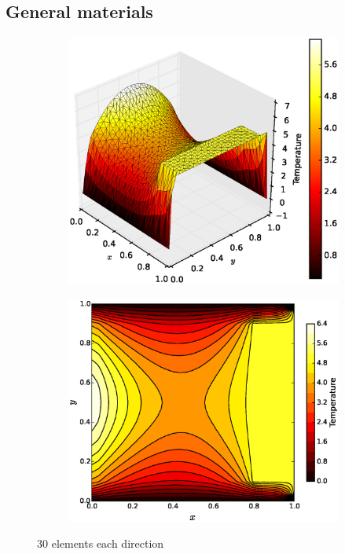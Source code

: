 \documentclass[10pt, a4paper]{article}
\begin{document}
\subsection{General materials}

\begin{figure}[H]
\centering
	\begin{subfigure}[H]{0.5\textwidth}
		\includegraphics[width=1.2\textwidth]{fig/figure_6.eps}
		\caption{}
		\label{fig:1}
	\end{subfigure}
	\begin{subfigure}[H]{0.3\textwidth}
		\includegraphics[width=\textwidth]{fig/figure_6.1.eps}
		\caption{}
		\label{fig:2}
	\end{subfigure}
	\caption{30 elements each direction}
	\label{fig:3_1}
\end{figure}
\end{document}
